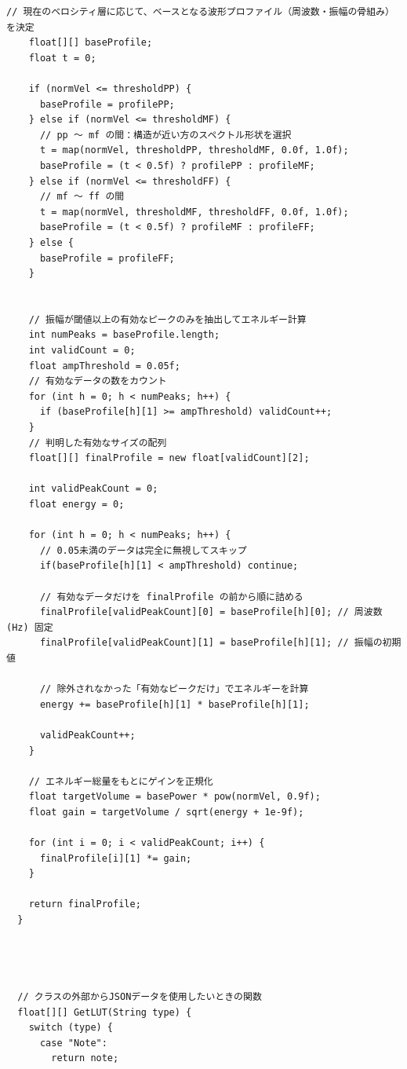 \begin{lstlisting}[caption={Utils.pde}, label={lst:proc_utils}]
    // 現在のベロシティ層に応じて、ベースとなる波形プロファイル（周波数・振幅の骨組み）を決定
    float[][] baseProfile;
    float t = 0;
    
    if (normVel <= thresholdPP) {
      baseProfile = profilePP;
    } else if (normVel <= thresholdMF) {
      // pp ～ mf の間：構造が近い方のスペクトル形状を選択
      t = map(normVel, thresholdPP, thresholdMF, 0.0f, 1.0f);
      baseProfile = (t < 0.5f) ? profilePP : profileMF;
    } else if (normVel <= thresholdFF) {
      // mf ～ ff の間
      t = map(normVel, thresholdMF, thresholdFF, 0.0f, 1.0f);
      baseProfile = (t < 0.5f) ? profileMF : profileFF;
    } else {
      baseProfile = profileFF;
    }
    
    
    // 振幅が閾値以上の有効なピークのみを抽出してエネルギー計算
    int numPeaks = baseProfile.length;
    int validCount = 0;
    float ampThreshold = 0.05f;
    // 有効なデータの数をカウント
    for (int h = 0; h < numPeaks; h++) { 
      if (baseProfile[h][1] >= ampThreshold) validCount++; 
    }
    // 判明した有効なサイズの配列
    float[][] finalProfile = new float[validCount][2];
    
    int validPeakCount = 0;
    float energy = 0;
    
    for (int h = 0; h < numPeaks; h++) { 
      // 0.05未満のデータは完全に無視してスキップ
      if(baseProfile[h][1] < ampThreshold) continue; 
      
      // 有効なデータだけを finalProfile の前から順に詰める
      finalProfile[validPeakCount][0] = baseProfile[h][0]; // 周波数 (Hz) 固定
      finalProfile[validPeakCount][1] = baseProfile[h][1]; // 振幅の初期値
      
      // 除外されなかった「有効なピークだけ」でエネルギーを計算
      energy += baseProfile[h][1] * baseProfile[h][1];
      
      validPeakCount++; 
    }
    
    // エネルギー総量をもとにゲインを正規化
    float targetVolume = basePower * pow(normVel, 0.9f);
    float gain = targetVolume / sqrt(energy + 1e-9f);
    
    for (int i = 0; i < validPeakCount; i++) {
      finalProfile[i][1] *= gain; 
    }
    
    return finalProfile;
  }
  
  
  
  
  // クラスの外部からJSONデータを使用したいときの関数
  float[][] GetLUT(String type) {
    switch (type) {
      case "Note":
        return note;
      

\end{lstlisting}
